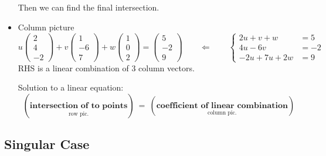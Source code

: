 \begin{itemize}
\begin{answer}
        Then we can find the final intersection.
    \end{answer}

    \item Column picture
    \[
    u \left(\begin{matrix}
        2 \\ 4 \\ -2
    \end{matrix}\right) + 
    v \left(\begin{matrix}
        1 \\ -6 \\ 7
    \end{matrix}\right) + 
    w \left(\begin{matrix}
        1 \\ 0 \\ 2
    \end{matrix}\right) = 
    \left(\begin{matrix}
        5 \\ -2 \\ 9
    \end{matrix}\right) \qquad \Longleftarrow \qquad
    \begin{cases}
        2u +v +w&=5\\
        4u-6v &=-2 \\
        -2u + 7u + 2w &= 9
    \end{cases}
    \]
    RHS is a linear combination of 3 column vectors.

    \begin{theorem}
    Solution to a linear equation:
    \[
    (\underset{\text{row pic.}}{\textbf{intersection of to points}}) \ = \ (\underset{\text{column pic.}}{\textbf{coefficient of linear combination}})
    \]
    \end{theorem}
\end{itemize}

\newpage

\subsection{Singular Case}

